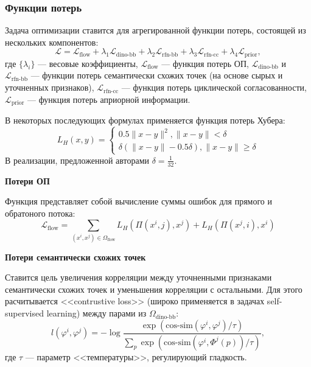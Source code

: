 \documentclass[a4paper, 14pt]{extarticle}
\theoremstyle{definition}
\theoremstyle{plain}
\theoremstyle{remark}
\begin{document}
\subsubsection{Функции потерь}
Задача оптимизации ставится для агрегированной функции потерь, состоящей из нескольких компонентов:
\begin{equation} \label{eq:loss}
	\mathcal{L} = \mathcal{L}_{\text{flow}} + \lambda_1 \mathcal{L}_{\text{dino-bb}} + \lambda_2 \mathcal{L}_{\text{rfn-bb}} + \lambda_3 \mathcal{L}_{\text{rfn-cc}} + \lambda_4 \mathcal{L}_{\text{prior}},
\end{equation}
где $\{\lambda_i\}$ --- весовые коэффициенты, $\mathcal{L}_{\text{flow}}$ --- функция потерь ОП, $\mathcal{L}_{\text{dino-bb}}$ и $\mathcal{L}_{\text{rfn-bb}}$ --- функции потерь семантически схожих точек (на основе сырых и уточненных признаков), $\mathcal{L}_{\text{rfn-cc}}$ --- функция потерь циклической согласованности, $\mathcal{L}_{\text{prior}}$ --- функция потерь априорной информации.

В некоторых последующих формулах применяется функция потерь Хубера:
\begin{equation}
	L_H(x, y) = \begin{cases}
		0.5\|x-y\|^2, \|x - y\| < \delta \\
		\delta(\|x-y\| - 0.5\delta), \|x-y\| \ge \delta
	\end{cases}
\end{equation}
В реализации, предложенной авторами $\delta=\frac{1}{32}$.

\textbf{Потери ОП}

Функция представляет собой вычисление суммы ошибок для прямого и обратоного потока:
\begin{equation}
	\mathcal{L}_{\text{flow}} = \sum_{(x^i, x^j) \in \Omega_{\text{flow}}} L_H(\Pi(x^i, j), x^j) + L_H(\Pi(x^j, i), x^i)
\end{equation}

\textbf{Потери семантически схожих точек}

Ставится цель увеличения корреляции между уточненными признаками семантически схожих точек и уменьшения корреляции с остальными. Для этого расчитывается <<contrustive loss>> (широко применяется в задачах self-supervised learning) между парами из $\Omega_{\text{dino-bb}}$:
\begin{equation} \label{eq:bb-loss}
	l(\varphi^i, \varphi^j) = -\log \frac{\exp(\text{cos-sim}(\varphi^i, \varphi^j) / \tau)}{\sum_p \exp(\text{cos-sim}(\varphi^i, \Phi^j(p)) / \tau)},
\end{equation}
где $\tau$ --- параметр <<температуры>>, регулирующий гладкость.
\end{document}
